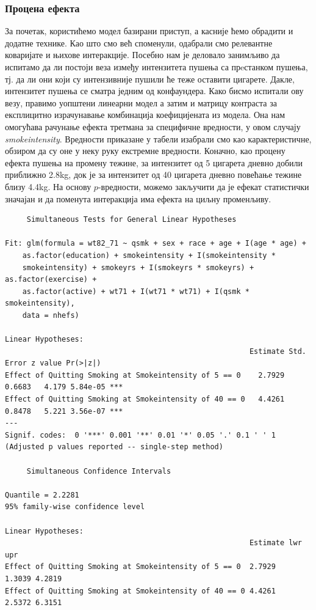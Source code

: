 \documentclass[12pt, a4paper]{article}
\begin{document}
\subsubsection*{Процена ефекта}
За почетак, користићемо модел базирани приступ, а касније ћемо обрадити и додатне технике. Као што смо већ споменули, одабрали смо релевантне коваријате и њихове интеракције. Посебно нам је деловало занимљиво да испитамо да ли постоји веза између интензитета пушења са прeстанком пушења, тј. да ли они који су интензивније пушили ће теже оставити цигарете. Дакле, интензитет пушења се сматра једним од конфаундера. Како бисмо испитали ову везу, правимо уопштени линеарни модел а затим и матрицу контраста за експлицитно израчунавање комбинација коефицијената из модела. Она нам омогућава рачунање ефекта третмана за специфичне вредности, у овом случају \textit{smokeintensity}. Вредности приказане у табели изабрали смо као карактеристичне, обзиром да су оне у неку руку екстремне вредности. Коначно, као процену ефекта пушења на промену тежине, за интензитет од 5 цигарета дневно добили приближно 2.8kg, док је за интензитет од 40 цигарета дневно повећање тежине близу 4.4kg. На основу $p$-вредности, можемо закључити да је ефекат статистички значајан и да поменута интеракција има ефекта на циљну променљиву. 

\begin{lstlisting}
	 Simultaneous Tests for General Linear Hypotheses

Fit: glm(formula = wt82_71 ~ qsmk + sex + race + age + I(age * age) + 
    as.factor(education) + smokeintensity + I(smokeintensity * 
    smokeintensity) + smokeyrs + I(smokeyrs * smokeyrs) + as.factor(exercise) + 
    as.factor(active) + wt71 + I(wt71 * wt71) + I(qsmk * smokeintensity), 
    data = nhefs)

Linear Hypotheses:
                                                        Estimate Std. Error z value Pr(>|z|)    
Effect of Quitting Smoking at Smokeintensity of 5 == 0    2.7929     0.6683   4.179 5.84e-05 ***
Effect of Quitting Smoking at Smokeintensity of 40 == 0   4.4261     0.8478   5.221 3.56e-07 ***
---
Signif. codes:  0 '***' 0.001 '**' 0.01 '*' 0.05 '.' 0.1 ' ' 1
(Adjusted p values reported -- single-step method)

	 Simultaneous Confidence Intervals

Quantile = 2.2281
95% family-wise confidence level

Linear Hypotheses:
                                                        Estimate lwr    upr   
Effect of Quitting Smoking at Smokeintensity of 5 == 0  2.7929   1.3039 4.2819
Effect of Quitting Smoking at Smokeintensity of 40 == 0 4.4261   2.5372 6.3151
\end{lstlisting}
\end{document}
